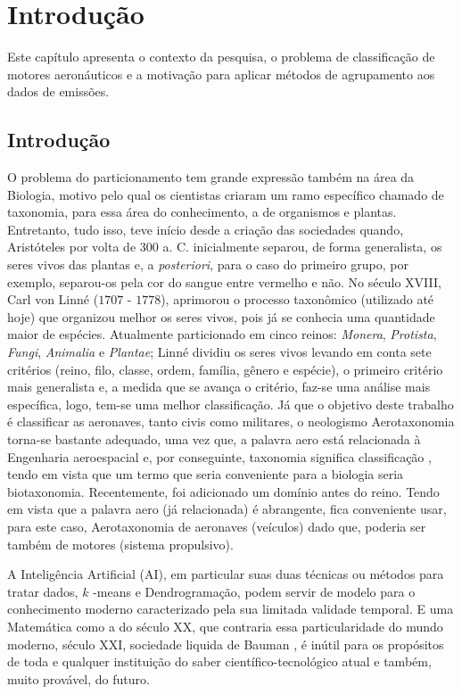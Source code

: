 \documentclass[12pt]{article}
\begin{document}
	\chapter{Introdução}

		Este capítulo apresenta o contexto da pesquisa, o problema de classificação de motores aeronáuticos e a motivação para aplicar métodos de agrupamento aos dados de emissões.
	
		\section{Introdução}
		
			O problema do particionamento tem grande expressão também na área da Biologia, motivo pelo qual os cientistas criaram um ramo específico chamado de taxonomia, para essa área do conhecimento, a de organismos e plantas. Entretanto, tudo isso, teve início desde a criação das sociedades quando, Aristóteles por volta de $ 300 $ a. C. inicialmente separou, de forma generalista, os seres vivos das plantas e, a \textit{posteriori}, para o caso do primeiro grupo, por exemplo, separou-os pela cor do sangue entre vermelho e não. No século XVIII, Carl von Linné ($ 1707 $ - $ 1778 $), aprimorou o processo taxonômico (utilizado até hoje) que organizou melhor os seres vivos, pois já se conhecia uma quantidade maior de espécies. Atualmente  particionado em cinco reinos: \textit{Monera}, \textit{Protista}, \textit{Fungi}, \textit{Animalia} e \textit{Plantae}; Linné dividiu os seres vivos levando em conta sete critérios (reino, filo, classe, ordem, família, gênero e espécie), o primeiro critério mais generalista e, a medida que se avança o critério, faz-se uma análise mais específica, logo, tem-se uma melhor classificação. Já que o objetivo deste trabalho é classificar as aeronaves, tanto civis como militares, o neologismo Aerotaxonomia torna-se bastante adequado, uma vez que, a palavra aero está relacionada à Engenharia aeroespacial e, por conseguinte, taxonomia significa classificação \cite{Linnaeus1758}, tendo em vista que um termo que seria conveniente para a biologia seria biotaxonomia. Recentemente, foi adicionado um domínio antes do reino. Tendo em vista que a palavra aero (já relacionada) é abrangente, fica conveniente usar, para este caso, Aerotaxonomia de aeronaves (veículos) dado que, poderia ser também de motores (sistema propulsivo). 
			
			A Inteligência Artificial (AI), em particular suas duas técnicas ou métodos para  tratar dados, $ k $ -means e Dendrogramação, podem servir de modelo para o conhecimento moderno caracterizado pela sua limitada validade temporal. E uma Matemática como a do século XX, que contraria essa particularidade do mundo moderno, século XXI, sociedade liquida de Bauman \cite{Bauman2000}, é inútil para os propósitos de toda e qualquer instituição do saber científico-tecnológico atual e também, muito provável, do futuro.
			
\end{document}
